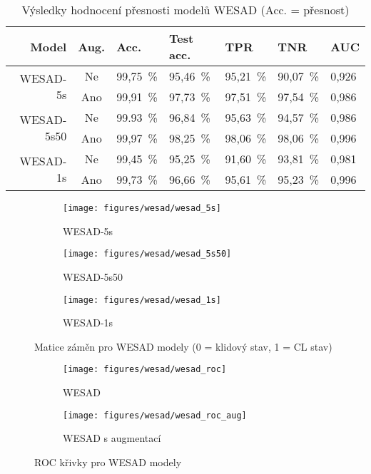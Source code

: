 \begin{table}[h]
    \small
    \centering
    \caption{Výsledky hodnocení přesnosti modelů WESAD (Acc. = přesnost)}
    \begin{tabular*}{\linewidth}{@{\extracolsep{\fill}} r| c | lllll @{}}
        \toprule
        Model                       & Aug. & Acc.     & Test acc. & TPR      & TNR      & AUC   \\ \midrule
        \multirow{2}{*}{WESAD-5s}   & Ne   & 99,75~\% & 95,46~\%  & 95,21~\% & 90,07~\% & 0,926 \\
        & Ano  & 99,91~\% & 97,73~\%  & 97,51~\% & 97,54~\% & 0,986 \\ \midrule
        \multirow{2}{*}{WESAD-5s50} & Ne   & 99.93~\% & 96,84~\%  & 95,63~\% & 94,57~\% & 0,986 \\
        & Ano  & 99,97~\% & 98,25~\%  & 98,06~\% & 98,06~\% & 0,996 \\ \midrule
        \multirow{2}{*}{WESAD-1s}   & Ne   & 99,45~\% & 95,25~\%  & 91,60~\% & 93,81~\% & 0,981 \\
        & Ano  & 99,73~\% & 96,66~\%  & 95,61~\% & 95,23~\% & 0,996 \\
        \bottomrule
    \end{tabular*}
    \label{tab:wesad_eval}
\end{table}

\begin{figure}[!htb]
    \centering
    \begin{subfigure}[h]{0.32\linewidth}
        \texttt{[image: figures/wesad/wesad\_5s]}
        \caption{WESAD-5s}
    \end{subfigure}
    \hspace{0.05cm}
    \begin{subfigure}[h]{0.32\linewidth}
        \texttt{[image: figures/wesad/wesad\_5s50]}
        \caption{WESAD-5s50}
    \end{subfigure}
    \hspace{0.05cm}
    \begin{subfigure}[h]{0.32\linewidth}
        \texttt{[image: figures/wesad/wesad\_1s]}
        \caption{WESAD-1s}
    \end{subfigure}
    \caption{Matice záměn pro WESAD modely (0 = klidový stav, 1 = CL stav)}
    \label{fig:results_cm_wesad}
\end{figure}

\begin{figure}[!htb]
    \centering
    \begin{subfigure}[h]{0.42\linewidth}
        \texttt{[image: figures/wesad/wesad\_roc]}
        \caption{WESAD}
    \end{subfigure}
    \hspace{0.1cm}
    \begin{subfigure}[h]{0.42\linewidth}
        \texttt{[image: figures/wesad/wesad\_roc\_aug]}
        \caption{WESAD s augmentací}
    \end{subfigure}
    \caption{ROC křivky pro WESAD modely}
    \label{fig:results_roc_wesad}
\end{figure}


